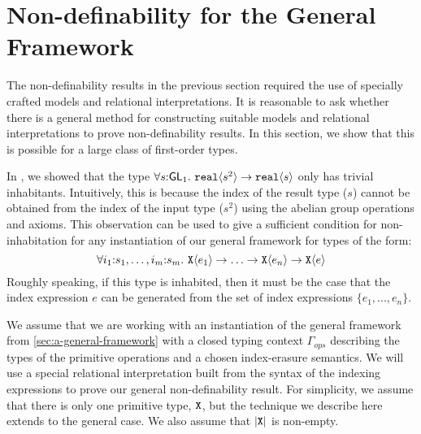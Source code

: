 \section{Non-definability for the General Framework}
\label{sec:general-nondef}

The non-definability results in the previous section required the use
of specially crafted models and relational interpretations. It is
reasonable to ask whether there is a general method for constructing
suitable models and relational interpretations to prove
non-definability results. In this section, we show that this is
possible for a large class of first-order types.

In , we showed that the type $\forall s
\mathord: \mathsf{GL}_1.~\textup{\texttt{real}}\langle s^2 \rangle \to \textup{\texttt{real}}\langle s \rangle$ only has
trivial inhabitants. Intuitively, this is because the index of the
result type ($s$) cannot be obtained from the index of the input type
($s^2$) using the abelian group operations and axioms. This
observation can be used to give a sufficient condition for
non-inhabitation for any instantiation of our general framework for
types of the form:
\begin{displaymath}
  \forall i_1\mathord:s_1,\ldots,i_m\mathord:s_m.~\textup{\texttt{X}}\langle e_1 \rangle \to \ldots \to \textup{\texttt{X}}\langle e_n \rangle \to \textup{\texttt{X}}\langle e \rangle
\end{displaymath}
Roughly speaking, if this type is inhabited, then it must be the case
that the index expression $e$ can be generated from the set of index
expressions $\{e_1,...,e_n\}$.

We assume that we are working with an instantiation of the general
framework from \autoref{sec:a-general-framework} with a closed typing
context $\Gamma_{\mathit{ops}}$ describing the types of the primitive
operations and a chosen index-erasure semantics. We will use a special
relational interpretation built from the syntax of the indexing
expressions to prove our general non-definability result. For
simplicity, we assume that there is only one primitive type,
$\textup{\texttt{X}}$, but the technique we describe here extends to the
general case. We also assume that $\left| \textup{\texttt{X}}\right|$ is non-empty.

